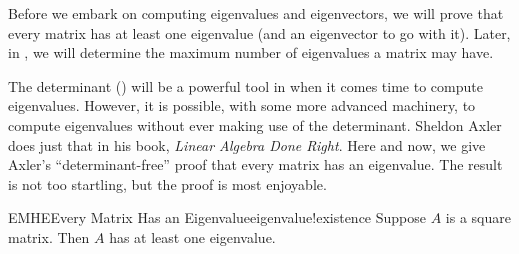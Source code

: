 %
%
Before we embark on computing eigenvalues and eigenvectors, we will prove that every matrix has at least one eigenvalue (and an eigenvector to go with it).  Later, in , we will determine the maximum number of eigenvalues a matrix may have.\par
%
The determinant () will be a powerful tool in  when it comes time to compute eigenvalues.  However, it is possible, with some more advanced machinery, to compute eigenvalues without ever making use of the determinant.  Sheldon Axler does just that in his book, {\sl Linear Algebra Done Right}.  Here and now, we give Axler's ``determinant-free'' proof that every matrix has an eigenvalue.  The result is not too startling, but the proof is most enjoyable.
%
\begin{theorem}{EMHE}{Every Matrix Has an Eigenvalue}{eigenvalue!existence}
Suppose $A$ is a square matrix.  Then $A$ has at least one eigenvalue.
\end{theorem}
%
